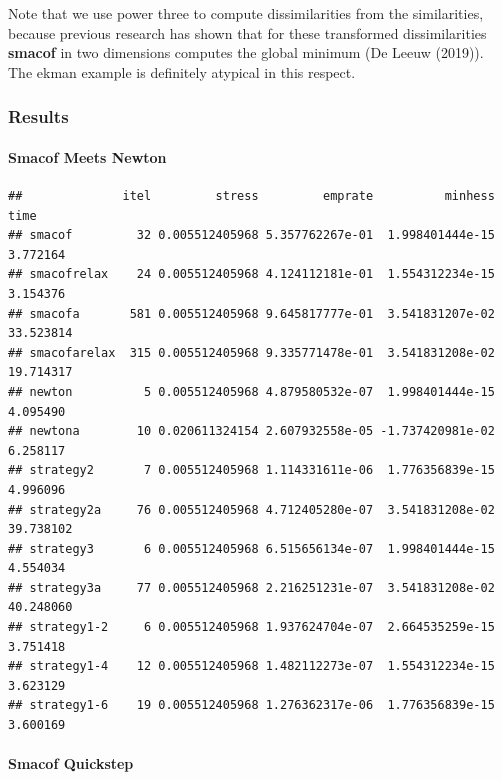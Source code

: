 \documentclass[
  12pt,
]{article}
\newenvironment{Shaded}{\begin{snugshade}}{\end{snugshade}}
\newcommand{\AttributeTok}[1]{\textcolor[rgb]{0.13,0.29,0.53}{#1}}
\newcommand{\DecValTok}[1]{\textcolor[rgb]{0.00,0.00,0.81}{#1}}
\newcommand{\FunctionTok}[1]{\textcolor[rgb]{0.13,0.29,0.53}{\textbf{#1}}}
\newcommand{\NormalTok}[1]{#1}
\newcommand{\SpecialCharTok}[1]{\textcolor[rgb]{0.81,0.36,0.00}{\textbf{#1}}}
\begin{document}
Note that we use power three to compute dissimilarities from the similarities, because previous research has shown that for these transformed dissimilarities \textbf{smacof} in two dimensions computes the global minimum (De Leeuw (2019)). The ekman example is definitely atypical in this respect.

\subsubsection{Results}\label{results-1}

\paragraph{Smacof Meets Newton}\label{smacof-meets-newton-1}

\begin{Shaded}
\end{Shaded}

\begin{verbatim}
##              itel         stress         emprate          minhess      time
## smacof         32 0.005512405968 5.357762267e-01  1.998401444e-15  3.772164
## smacofrelax    24 0.005512405968 4.124112181e-01  1.554312234e-15  3.154376
## smacofa       581 0.005512405968 9.645817777e-01  3.541831207e-02 33.523814
## smacofarelax  315 0.005512405968 9.335771478e-01  3.541831208e-02 19.714317
## newton          5 0.005512405968 4.879580532e-07  1.998401444e-15  4.095490
## newtona        10 0.020611324154 2.607932558e-05 -1.737420981e-02  6.258117
## strategy2       7 0.005512405968 1.114331611e-06  1.776356839e-15  4.996096
## strategy2a     76 0.005512405968 4.712405280e-07  3.541831208e-02 39.738102
## strategy3       6 0.005512405968 6.515656134e-07  1.998401444e-15  4.554034
## strategy3a     77 0.005512405968 2.216251231e-07  3.541831208e-02 40.248060
## strategy1-2     6 0.005512405968 1.937624704e-07  2.664535259e-15  3.751418
## strategy1-4    12 0.005512405968 1.482112273e-07  1.554312234e-15  3.623129
## strategy1-6    19 0.005512405968 1.276362317e-06  1.776356839e-15  3.600169
\end{verbatim}

\paragraph{Smacof Quickstep}\label{smacof-quickstep-1}
\end{document}
